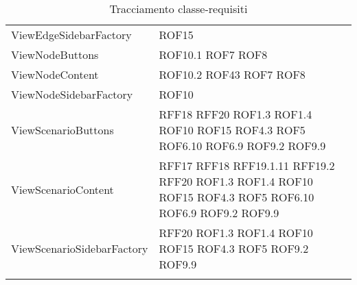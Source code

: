 \begin{longtable}{p{5cm}!{\VRule[1pt]}p{2.5cm}}
	ViewEdgeSidebarFactory & ROF15\\
	ViewNodeButtons & ROF10.1 \newline ROF7 \newline ROF8\\
	ViewNodeContent & ROF10.2 \newline ROF43 \newline ROF7 \newline ROF8\\
	ViewNodeSidebarFactory & ROF10\\
	ViewScenarioButtons & RFF18 \newline RFF20 \newline ROF1.3 \newline ROF1.4 \newline ROF10 \newline ROF15 \newline ROF4.3 \newline ROF5 \newline ROF6.10 \newline ROF6.9 \newline ROF9.2 \newline ROF9.9\\
	ViewScenarioContent & RFF17 \newline RFF18 \newline RFF19.1.11 \newline RFF19.2 \newline RFF20 \newline ROF1.3 \newline ROF1.4 \newline ROF10 \newline ROF15 \newline ROF4.3 \newline ROF5 \newline ROF6.10 \newline ROF6.9 \newline ROF9.2 \newline ROF9.9\\
	ViewScenarioSidebarFactory & RFF20 \newline ROF1.3 \newline ROF1.4 \newline ROF10 \newline ROF15 \newline ROF4.3 \newline ROF5 \newline ROF9.2 \newline ROF9.9\\
	\caption{Tracciamento classe-requisiti}
\end{longtable}

